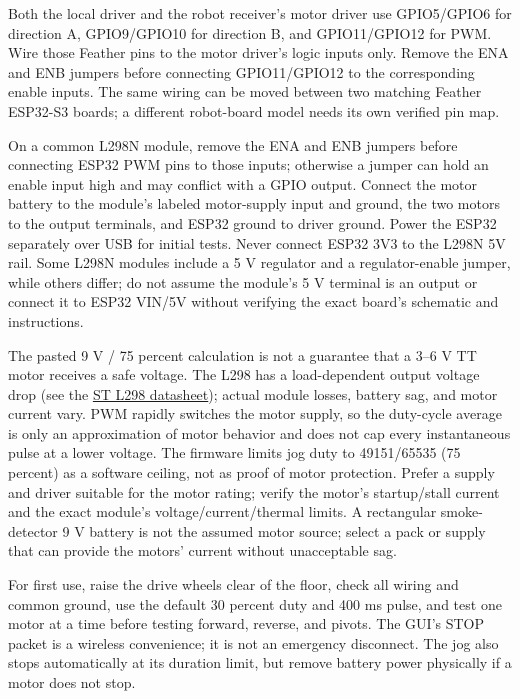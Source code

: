 \documentclass{article}
\begin{document}
Both the local driver and the robot receiver's motor driver use GPIO5/GPIO6 for direction A, GPIO9/GPIO10 for direction B, and GPIO11/GPIO12 for PWM. Wire those Feather pins to the motor driver's logic inputs only. Remove the ENA and ENB jumpers before connecting GPIO11/GPIO12 to the corresponding enable inputs. The same wiring can be moved between two matching Feather ESP32-S3 boards; a different robot-board model needs its own verified pin map.

On a common L298N module, remove the ENA and ENB jumpers before connecting ESP32 PWM pins to those inputs; otherwise a jumper can hold an enable input high and may conflict with a GPIO output. Connect the motor battery to the module's labeled motor-supply input and ground, the two motors to the output terminals, and ESP32 ground to driver ground. Power the ESP32 separately over USB for initial tests. Never connect ESP32 3V3 to the L298N 5V rail. Some L298N modules include a 5 V regulator and a regulator-enable jumper, while others differ; do not assume the module's 5 V terminal is an output or connect it to ESP32 VIN/5V without verifying the exact board's schematic and instructions.

The pasted 9 V / 75 percent calculation is not a guarantee that a 3--6 V TT motor receives a safe voltage. The L298 has a load-dependent output voltage drop (see the \href{https://www.st.com/resource/en/datasheet/l298.pdf}{ST L298 datasheet}); actual module losses, battery sag, and motor current vary. PWM rapidly switches the motor supply, so the duty-cycle average is only an approximation of motor behavior and does not cap every instantaneous pulse at a lower voltage. The firmware limits jog duty to 49151/65535 (75 percent) as a software ceiling, not as proof of motor protection. Prefer a supply and driver suitable for the motor rating; verify the motor's startup/stall current and the exact module's voltage/current/thermal limits. A rectangular smoke-detector 9 V battery is not the assumed motor source; select a pack or supply that can provide the motors' current without unacceptable sag.

For first use, raise the drive wheels clear of the floor, check all wiring and common ground, use the default 30 percent duty and 400 ms pulse, and test one motor at a time before testing forward, reverse, and pivots. The GUI's STOP packet is a wireless convenience; it is not an emergency disconnect. The jog also stops automatically at its duration limit, but remove battery power physically if a motor does not stop.
\end{document}
